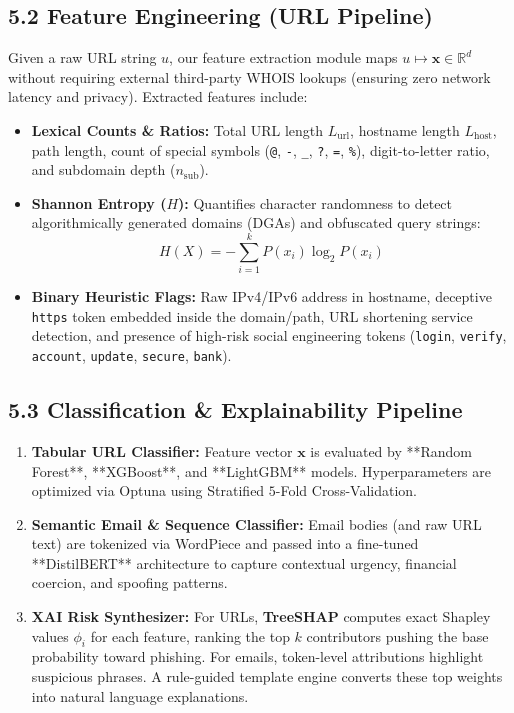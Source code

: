 \documentclass[10pt, a4paper]{article}
\begin{document}
\subsection{5.2 Feature Engineering (URL Pipeline)}
Given a raw URL string $u$, our feature extraction module maps $u \mapsto \mathbf{x} \in \mathbb{R}^{d}$ without requiring external third-party WHOIS lookups (ensuring zero network latency and privacy). Extracted features include:
\begin{itemize}
    \item \textbf{Lexical Counts \& Ratios:} Total URL length $L_{\text{url}}$, hostname length $L_{\text{host}}$, path length, count of special symbols (\texttt{@}, \texttt{-}, \texttt{\_}, \texttt{?}, \texttt{=}, \texttt{\%}), digit-to-letter ratio, and subdomain depth ($n_{\text{sub}}$).
    \item \textbf{Shannon Entropy ($H$):} Quantifies character randomness to detect algorithmically generated domains (DGAs) and obfuscated query strings:
    $$H(X) = -\sum_{i=1}^{k} P(x_i) \log_2 P(x_i)$$
    \item \textbf{Binary Heuristic Flags:} Raw IPv4/IPv6 address in hostname, deceptive \texttt{https} token embedded inside the domain/path, URL shortening service detection, and presence of high-risk social engineering tokens (\texttt{login}, \texttt{verify}, \texttt{account}, \texttt{update}, \texttt{secure}, \texttt{bank}).
\end{itemize}

\subsection{5.3 Classification \& Explainability Pipeline}
\begin{enumerate}
    \item \textbf{Tabular URL Classifier:} Feature vector $\mathbf{x}$ is evaluated by **Random Forest**, **XGBoost**, and **LightGBM** models. Hyperparameters are optimized via Optuna using Stratified $5$-Fold Cross-Validation.
    \item \textbf{Semantic Email \& Sequence Classifier:} Email bodies (and raw URL text) are tokenized via WordPiece and passed into a fine-tuned **DistilBERT** architecture to capture contextual urgency, financial coercion, and spoofing patterns.
    \item \textbf{XAI Risk Synthesizer:} For URLs, \textbf{TreeSHAP} computes exact Shapley values $\phi_i$ for each feature, ranking the top $k$ contributors pushing the base probability toward phishing. For emails, token-level attributions highlight suspicious phrases. A rule-guided template engine converts these top weights into natural language explanations.
\end{enumerate}
\end{document}
